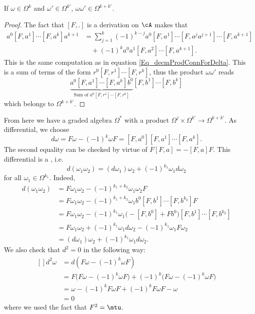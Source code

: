 \begin{lemma}
If $\omega\in\Omega^k$ and $\omega'\in\Omega^{k'}$, $\omega\omega'\in\Omega^{k+k'}$.
\end{lemma}

\begin{proof}
The fact that $[F,.]$ is a derivation on $\cA$ makes that 
\[ 
\begin{split}
  a^0[F,a^1]\cdots[F,a^{k}]a^{k+1}&=\sum_{j=1}^{k}(-1)^{k-j}a^0[F,a^1]\cdots[F,a^{j}a^{j+1}]\cdots[F,a^{k+1}]\\
					&\quad+(-1)^ka^0a^1[F,a^2]\cdots[F,a^{k+1}].
\end{split}
\]
This is the same computation as in equation \eqref{Eq_decmProdConnForDelta}. This is a sum of terms of the form $r^0[F,r^1]\cdots[F,r^k]$, thus the product $\omega\omega'$ reads
\[ 
  \underbrace{a^0[F,a^1]\cdots[F,a^{k}]b^0}_{\textrm{Sum of }a^0[F,r^1]\cdots[F,r^k]}[F,b^1]\cdots[F,b^k]
\]
which belongs to $\Omega^{k+k'}$.
\end{proof}
From here we have a graded algebra $\Omega^*$ with a product $\Omega^j\times\Omega^{k'}\to\Omega^{k+k'}$. As differential, we choose
\begin{equation}  \label{EqFreddDefbel}
d\omega=F\omega-(-1)^k\omega F=[F,a^0][F,a^1]\cdots[F,a^{k}].
\end{equation}
The second equality can be checked by virtue of $F[F,a]=-[F,a]F$. This differential is a , i.e.
\begin{equation}
  d(\omega_1\omega_2)=(d\omega_1)\omega_2+(-1)^{k_1}\omega_1d\omega_2
\end{equation}
for all $\omega_1\in\Omega^{k_1}$. Indeed,
\[ 
\begin{split}
d(\omega_1\omega_2)&=F\omega_1\omega_2-(-1)^{k_1+k_2}\omega_1\omega_2 F\\
		&=F\omega_1\omega_2-(-1)^{k_1+k_2}\omega_1b^0[F,b^1]\cdots[F,b^{k_2}]F\\
		&=F\omega_1\omega_2-(-1)^{k_1}\omega_1\big( -[F,b^0]+Fb^0 \big)[F,b^1]\cdots[F,b^{k_2}]\\
		&=F\omega_1\omega_2+(-1)^{k_1}\omega_1d\omega_2-(-1)^{k_1}\omega_1 F\omega_2\\
		&=(d\omega_1)\omega_2+(-1)^{k_1}\omega_1 d\omega_2.
\end{split}  
\]
We also check that $d^2=0$ in the following way:
\begin{equation}
	\begin{aligned}[]
		d^2\omega&=d(F\omega-(-1)^k\omega F)\\
		&=F\big( F\omega-(-1)^k\omega F \big)+(-1)^{k}\big( F\omega-(-1)^k\omega F \big)\\
		&=\omega-(-1)^kF\omega F+(-1)^k F\omega F-\omega\\
		&=0
	\end{aligned}
\end{equation}
where we used the fact that $F^2=\mtu$.

